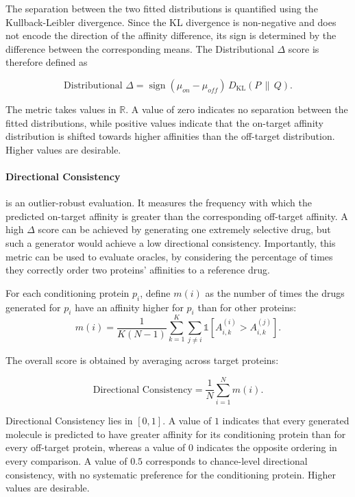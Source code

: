 \documentclass[a4paper,12pt]{article}
\begin{document}
The separation between the two fitted distributions is quantified using the Kullback-Leibler divergence. Since the KL divergence is non-negative and does not encode the direction of the affinity difference, its sign is determined by the difference between the corresponding means. The Distributional $\Delta$ score is therefore defined as

\begin{equation*}
    \text{Distributional }\Delta
    =
    \operatorname{sign}(\mu_{on}-\mu_{off})\,
    D_{\mathrm{KL}}\!\left(P\,\|\,Q\right).
\end{equation*}

The metric takes values in $\mathbb{R}$. A value of zero indicates no separation between the fitted distributions, while positive values indicate that the on-target affinity distribution is shifted towards higher affinities than the off-target distribution. Higher values are desirable.

\paragraph{Directional Consistency}
is an outlier-robust evaluation. It measures the frequency with which the predicted on-target affinity is greater than the corresponding off-target affinity. A high $\Delta$ score can be achieved by generating one extremely selective drug, but such a generator would achieve a low directional consistency. Importantly, this metric can be used to evaluate oracles, by considering the percentage of times they correctly order two proteins' affinities to a reference drug.

For each conditioning protein $p_i$, define $m(i)$ as the number of times the drugs generated for $p_i$ have an affinity higher for $p_i$ than for other proteins:
\begin{equation*}
    m(i)
    =
    \frac{1}{K(N-1)}
    \sum_{k=1}^{K}
    \sum_{j\neq i}
    \mathds{1}\!\left[
        A_{i,k}^{(i)}
        >
        A_{i,k}^{(j)}
        \right].
\end{equation*}

The overall score is obtained by averaging across target proteins:

\begin{equation*}
    \text{Directional Consistency}
    =
    \frac{1}{N}
    \sum_{i=1}^{N}
    m(i).
\end{equation*}

Directional Consistency lies in $[0,1]$. A value of $1$ indicates that every generated molecule is predicted to have greater affinity for its conditioning protein than for every off-target protein, whereas a value of $0$ indicates the opposite ordering in every comparison. A value of $0.5$ corresponds to chance-level directional consistency, with no systematic preference for the conditioning protein. Higher values are desirable.
\end{document}
